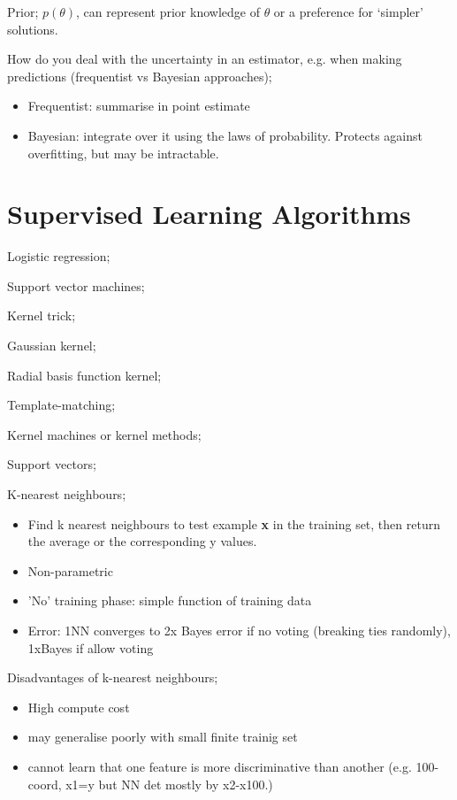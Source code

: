 \documentclass{article}
\begin{document}
Prior; $p(\theta)$, can represent prior knowledge of $\theta$ or a preference for `simpler' solutions.

How do you deal with the uncertainty in an estimator, e.g. when making predictions (frequentist vs Bayesian approaches); \begin{itemize} \item Frequentist: summarise in point estimate \item Bayesian: integrate over it using the laws of probability. Protects against overfitting, but may be intractable.  \end{itemize}

\section{Supervised Learning Algorithms}

Logistic regression;

Support vector machines;

Kernel trick;

Gaussian kernel;

Radial basis function kernel;

Template-matching;

Kernel machines or kernel methods;

Support vectors;

K-nearest neighbours; \begin{itemize} \item Find k nearest neighbours to test example \textbf{x} in the training set, then return the average or the corresponding y values.  \item Non-parametric \item 'No' training phase: simple function of training data \item Error: 1NN converges to 2x Bayes error if no voting (breaking ties randomly), 1xBayes if allow voting \end{itemize} 

Disadvantages of k-nearest neighbours; \begin{itemize} \item High compute cost \item may generalise poorly with small finite trainig set \item cannot learn that one feature is more discriminative than another (e.g. 100-coord, x1=y but NN det mostly by x2-x100.) \end{itemize}
\end{document}
